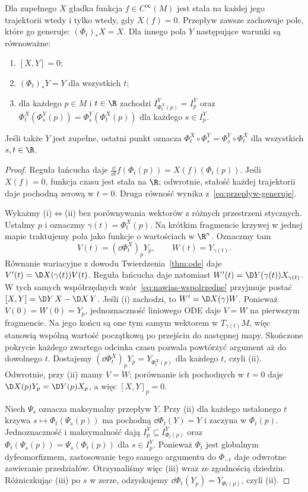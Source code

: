 \begin{stwierdzenie}\label{prop:inwarianty}
Dla zupełnego $X$ gładka funkcja $f\in C^\infty(M)$ jest stała na każdej jego trajektorii
wtedy i tylko wtedy, gdy $X(f)=0$. Przepływ zawsze zachowuje
pole, które go generuje: $(\Phi_t)_*X=X$.
Dla innego pola $Y$ następujące warunki są równoważne:
\begin{enumerate}[label=(\roman*)]
\item $[X,Y]=0$;
\item $(\Phi_t)_*Y=Y$ dla wszystkich $t$;
\item dla każdego $p\in M$ i $t\in\R$ zachodzi
$I^Y_{\Phi_t^X(p)}=I^Y_p$ oraz
$\Phi_t^X(\Phi_s^Y(p))=\Phi_s^Y(\Phi_t^X(p))$
dla każdego $s\in I^Y_p$.
\end{enumerate}
Jeśli także $Y$ jest zupełne, ostatni punkt oznacza
$\Phi_t^X\circ\Phi_s^Y=\Phi_s^Y\circ\Phi_t^X$ dla wszystkich $s,t\in\R$.
\end{stwierdzenie}
\begin{proof}
Reguła łańcucha daje
$\frac{\dd}{\dd t}f(\Phi_t(p))=X(f)(\Phi_t(p))$.
Jeśli $X(f)=0$, funkcja czasu jest stała na $\R$;
odwrotnie, stałość każdej trajektorii daje pochodną zerową w $t=0$.
Druga równość wynika z~\eqref{eq:przeplyw-generuje}.

Wykażmy (i)$\Leftrightarrow$(ii) bez porównywania wektorów
z różnych przestrzeni stycznych. Ustalmy $p$ i oznaczmy
$\gamma(t)=\Phi_t^X(p)$. Na krótkim fragmencie krzywej
w jednej mapie traktujemy pola jako funkcje o wartościach w $\R^n$.
Oznaczmy tam
\[
V(t)=(\dd\Phi_t^X)_pY_p,
\qquad W(t)=Y_{\gamma(t)}.
\]
Równanie wariacyjne z dowodu Twierdzenia~\ref{thm:ode}
daje $V'(t)=\D X(\gamma(t))V(t)$.
Reguła łańcucha daje natomiast
$W'(t)=\D Y(\gamma(t))X_{\gamma(t)}$.
W tych samych współrzędnych wzór~\eqref{eq:nawias-wspolrzedne}
przyjmuje postać $[X,Y]=\D Y\,X-\D X\,Y$.
Jeśli (i) zachodzi, to $W'=\D X(\gamma)W$.
Ponieważ $V(0)=W(0)=Y_p$, jednoznaczność liniowego ODE
daje $V=W$ na pierwszym fragmencie. Na jego końcu są one
tym samym wektorem w $T_{\gamma(t)}M$, więc stanowią wspólną
wartość początkową po przejściu do następnej mapy.
Skończone pokrycie każdego zwartego odcinka czasu pozwala
powtórzyć argument aż do dowolnego $t$. Dostajemy
$(\dd\Phi_t^X)_pY_p=Y_{\Phi_t^X(p)}$ dla każdego $t$,
czyli (ii). Odwrotnie, przy (ii) mamy $V=W$;
porównanie ich pochodnych w $t=0$ daje
$\D X(p)Y_p=\D Y(p)X_p$, a więc $[X,Y]_p=0$.

Niech $\Psi_s$ oznacza maksymalny przepływ $Y$. Przy (ii)
dla każdego ustalonego $t$ krzywa $s\mapsto\Phi_t(\Psi_s(p))$
ma pochodną $\dd\Phi_t(Y)=Y$ i zaczyna w $\Phi_t(p)$.
Jednoznaczność i maksymalność dają
$I_p^Y\subseteq I_{\Phi_t(p)}^Y$ oraz
$\Phi_t(\Psi_s(p))=\Psi_s(\Phi_t(p))$ dla $s\in I_p^Y$.
Ponieważ $\Phi_t$ jest globalnym dyfeomorfizmem, zastosowanie
tego samego argumentu do $\Phi_{-t}$ daje odwrotne zawieranie
przedziałów. Otrzymaliśmy więc (iii) wraz ze zgodnością dziedzin.
Różniczkując (iii) po $s$ w zerze, odzyskujemy
$\dd\Phi_t(Y_p)=Y_{\Phi_t(p)}$, czyli (ii).
\end{proof}

